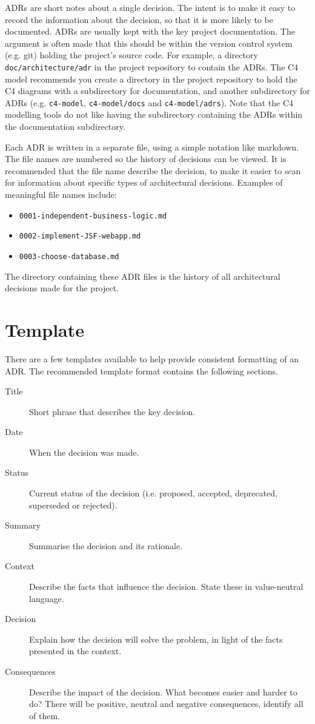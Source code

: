 ADRs are short notes about a single decision.
The intent is to make it easy to record the information about the decision, so that it is more likely to be documented.
ADRs are usually kept with the key project documentation.
The argument is often made that this should be within the version control system (e.g. git) holding the project's source code.
For example, a directory \texttt{doc/architecture/adr} in the project repository to contain the ADRs.
The C4 model recommends you create a directory in the project repository to hold the C4 diagrams
with a subdirectory for documentation, and another subdirectory for ADRs
(e.g. \texttt{c4-model}, \texttt{c4-model/docs} and \texttt{c4-model/adrs}).
Note that the C4 modelling tools do not like having the subdirectory containing the ADRs within the documentation subdirectory.

Each ADR is written in a separate file, using a simple notation like markdown.
The file names are numbered so the history of decisions can be viewed.
It is recommended that the file name describe the decision,
to make it easier to scan for information about specific types of architectural decisions.
Examples of meaningful file names include:
\begin{itemize}[noitemsep,nolistsep]
    \item \texttt{0001-independent-business-logic.md}
    \item \texttt{0002-implement-JSF-webapp.md}
    \item \texttt{0003-choose-database.md}
\end{itemize}
The directory containing these ADR files is the history of all architectural decisions made for the project.

\section{Template}
There are a few templates available to help provide consistent formatting of an ADR.
The recommended template format contains the following sections.
\begin{description}
    \item[Title] Short phrase that describes the key decision.
    \item[Date] When the decision was made.
    \item[Status] Current status of the decision (i.e. proposed, accepted, deprecated, superseded or rejected).
    \item[Summary] Summarise the decision and its rationale.
    \item[Context] Describe the facts that influence the decision. State these in value-neutral language.
    \item[Decision] Explain how the decision will solve the problem, in light of the facts presented in the context.
    \item[Consequences] Describe the impact of the decision. What becomes easier and harder to do?
                                       There will be positive, neutral and negative consequences, identify all of them.
\end{description}


